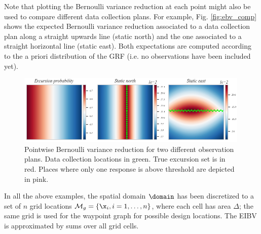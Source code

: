 Note that plotting the Bernoulli variance reduction at each point might also be used to compare different data collection plans. For example, Fig. \ref{fig:ebv_comp} shows the expected Bernoulli variance reduction associated to a data collection plan along a straight upwards line (static north) and the one associated to a straight horizontal line (static east). Both expectations are computed according to the a priori distribution of the GRF (i.e. no observations have been included yet).

\begin{figure}[h!] \centering
  \includegraphics[width=0.99\textwidth]{Figures/ebv_north_vs_east.png}
  \caption{Pointwise Bernoulli variance reduction for two different observation plans. Data collection locations in green. True excursion set is in red. Places where only one response is above threshold are depicted in pink.}
\label{fig:ebv_north_vs_east}
\end{figure}

\begin{remark}
In all the above examples, the spatial domain $\domain$ has been discretized to a set of $n$ grid
locations $\mathcal{M}_g = \{\x_i, i=1,\ldots,n \}$, where each cell
has area $\Delta$; the same grid is used for the waypoint graph for
possible design locations. The EIBV is approximated by sums over all
grid cells.
\end{remark}